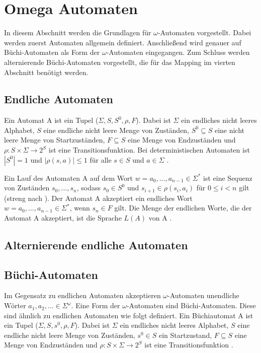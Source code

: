 \section{Omega Automaten}

In diesem Abschnitt werden die Grundlagen für $\omega$-Automaten vorgestellt. Dabei werden zuerst Automaten allgemein definiert. Anschließend wird genauer auf Büchi-Automaten als Form der $\omega$-Automaten eingegangen. Zum Schluss werden alternierende Büchi-Automaten vorgestellt, die für das Mapping im vierten Abschnitt benötigt werden. 

\subsection{Endliche Automaten}
Ein Automat A ist ein Tupel ($\Sigma, S, S^0, \rho, F$). Dabei ist $\Sigma$ ein endliches nicht leeres Alphabet, $S$ eine endliche nicht leere Menge von Zuständen, $S^0\subseteq S$ eine nicht leere Menge von Startzuständen, $F\subseteq S$ eine Menge von Endzuständen und $\rho : S \times \Sigma \rightarrow 2^S$ ist eine Transitionsfunktion. Bei deterministischen Automaten ist $|S^0|=1$ und $|\rho(s,a)|\leq 1$ für alle $s\in S$ und $a \in \Sigma$ \cite{vardi+96}.

Ein Lauf des Automaten A auf dem Wort $w=a_0,...,a_{n-1}\in \Sigma^\ast$ ist eine Sequenz von Zuständen $s_0,...,s_n$, sodass $s_0 \in S^0$ und $s_{i+1} \in \rho(s_i, a_i)$ für $0\leq i<n$ gilt (streng nach \cite{vardi+96}). Der Automat A akzeptiert ein endliches Wort $w=a_0,...,a_{n-1}\in\Sigma^\ast$, wenn $s_n\in F$ gilt. Die Menge der endlichen Worte, die der Automat A akzeptiert, ist die Sprache $L(A)$ von A \cite{vardi+96}. 

\subsection{Alternierende endliche Automaten}

\subsection{Büchi-Automaten}
Im Gegensatz zu endlichen Automaten akzeptieren $\omega$-Automaten unendliche Wörter $a_1,a_2,...\in\Sigma^{\omega}$. Eine Form der $\omega$-Automaten sind Büchi-Automaten. Diese sind ähnlich zu endlichen Automaten wie folgt definiert. Ein Büchiautomat A ist ein Tupel ($\Sigma, S, s^0, \rho, F$). Dabei ist $\Sigma$ ein endliches nicht leeres Alphabet, $S$ eine endliche nicht leere Menge von Zuständen, $s^0\in S$ ein Startzustand, $F\subseteq S$ eine Menge von Endzuständen und $\rho : S \times \Sigma \rightarrow 2^S$ ist eine Transitionsfunktion \cite{hofmann11,vardi+96}.

